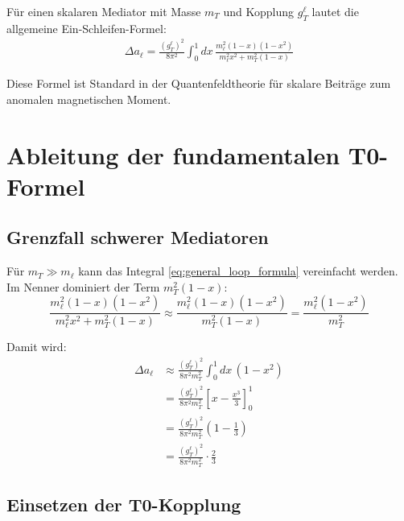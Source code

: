 	Für einen skalaren Mediator mit Masse $m_T$ und Kopplung $g_T^\ell$ lautet die allgemeine Ein-Schleifen-Formel:
	\begin{equation}
		\begin{split}
			\Delta a_\ell = \frac{(g_T^\ell)^2}{8\pi^2} \int_0^1 dx \, 
			\frac{m_\ell^2 (1-x)(1-x^2)}{m_\ell^2 x^2 + m_T^2 (1-x)}
		\end{split}
		\label{eq:general_loop_formula}
	\end{equation}
	
	Diese Formel ist Standard in der Quantenfeldtheorie für skalare Beiträge zum anomalen magnetischen Moment.
	
	\section{Ableitung der fundamentalen T0-Formel}
	
	\subsection{Grenzfall schwerer Mediatoren}
	
	Für $m_T \gg m_\ell$ kann das Integral \eqref{eq:general_loop_formula} vereinfacht werden. Im Nenner dominiert der Term $m_T^2 (1-x)$:
	\begin{equation}
		\frac{m_\ell^2 (1-x)(1-x^2)}{m_\ell^2 x^2 + m_T^2 (1-x)} 
		\approx \frac{m_\ell^2 (1-x)(1-x^2)}{m_T^2 (1-x)} 
		= \frac{m_\ell^2 (1-x^2)}{m_T^2}
		\label{eq:heavy_mediator_approx}
	\end{equation}
	
	Damit wird:
	\begin{equation}
		\begin{split}
			\Delta a_\ell &\approx \frac{(g_T^\ell)^2}{8\pi^2 m_T^2} \int_0^1 dx \, (1-x^2) \\
			&= \frac{(g_T^\ell)^2}{8\pi^2 m_T^2} \left[x - \frac{x^3}{3}\right]_0^1 \\
			&= \frac{(g_T^\ell)^2}{8\pi^2 m_T^2} \left(1 - \frac{1}{3}\right) \\
			&= \frac{(g_T^\ell)^2}{8\pi^2 m_T^2} \cdot \frac{2}{3}
		\end{split}
		\label{eq:integral_evaluation}
	\end{equation}
	
	\subsection{Einsetzen der T0-Kopplung}
	
